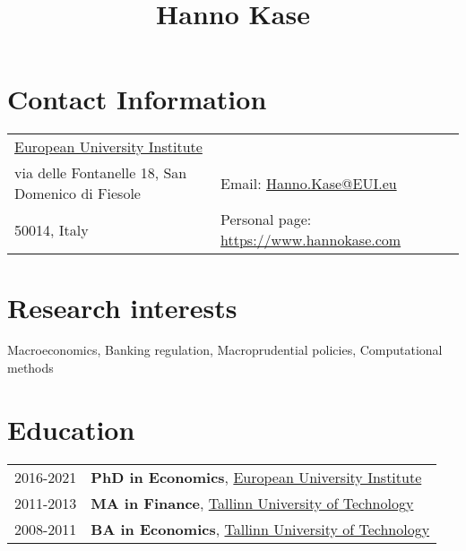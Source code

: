 \documentclass[a4, 11pt]{article}
\title{ {\Huge  Hanno Kase} }
\date{}
\begin{document}
    \maketitle


    \section*{Contact Information}
    \begin{table}[H]
      \begin{tabular}{ll}\href{https://www.eui.eu/}{European University Institute}&\\
        via delle Fontanelle 18, San Domenico di Fiesole&
        Email: \href{mailto:Hanno.Kase@EUI.eu}{Hanno.Kase@EUI.eu} \\
        50014, Italy& Personal page: \href{https://www.hannokase.com}{https://www.hannokase.com}
      \end{tabular}
    \end{table}

    \section*{Research interests}Macroeconomics, Banking regulation, Macroprudential policies, Computational methods

    \section*{Education}\begin{table}[H]
        \begin{tabular}{p{2.5cm}p{13.5cm}}
            2016-2021 & \textbf{PhD in Economics}, \href{https://www.eui.eu}{European University Institute}\\
            2011-2013 & \textbf{MA in Finance}, \href{https://www.ttu.ee/en}{Tallinn University of Technology}\\
            2008-2011 & \textbf{BA in Economics}, \href{https://www.ttu.ee/en}{Tallinn University of Technology}\\
        \end{tabular}
      \end{table}

\end{document}
